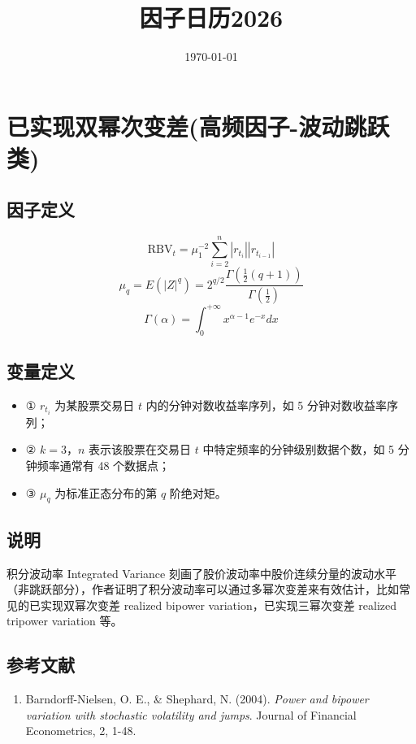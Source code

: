 \documentclass{article}
\title{因子日历2026}
\date{\today}
\begin{document}
\maketitle

\section{已实现双幂次变差(高频因子-波动跳跃类)}

\subsection{因子定义}
\begin{equation}
    \mathrm{RBV}_t = \mu_1^{-2} \sum_{i=2}^n |r_{t_i}| |r_{t_{i-1}}|
\end{equation}
\begin{equation}
    \mu_q = E(|Z|^q) = 2^{q/2} \frac{\Gamma\left(\frac{1}{2}(q+1)\right)}{\Gamma\left(\frac{1}{2}\right)}
\end{equation}
\begin{equation}
    \Gamma(\alpha) = \int_0^{+\infty} x^{\alpha-1} e^{-x} dx
\end{equation}

\subsection{变量定义}
\begin{itemize}
    \item ① \( r_{t_i} \) 为某股票交易日 \( t \) 内的分钟对数收益率序列，如 5 分钟对数收益率序列；
    \item ② \( k=3 \)，\( n \) 表示该股票在交易日 \( t \) 中特定频率的分钟级别数据个数，如 5 分钟频率通常有 48 个数据点；
    \item ③ \( \mu_q \) 为标准正态分布的第 \( q \) 阶绝对矩。
\end{itemize}

\subsection{说明}
积分波动率 Integrated Variance 刻画了股价波动率中股价连续分量的波动水平（非跳跃部分），作者证明了积分波动率可以通过多幂次变差来有效估计，比如常见的已实现双幂次变差 realized bipower variation，已实现三幂次变差 realized tripower variation 等。

\subsection{参考文献}
\begin{enumerate}
    \item Barndorff-Nielsen, O. E., \& Shephard, N. (2004). \textit{Power and bipower variation with stochastic volatility and jumps}. Journal of Financial Econometrics, 2, 1-48.
\end{enumerate}
\end{document}
